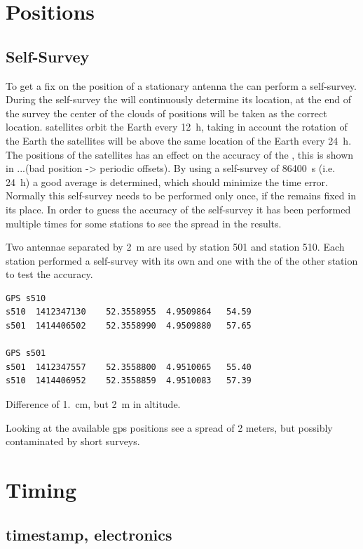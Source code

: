 \section{Positions}

\subsection{\gps Self-Survey}

To get a fix on the position of a stationary \gps antenna the \gps can perform a self-survey. During the self-survey the \gps will continuously determine its location, at the end of the survey the center of the clouds of positions will be taken as the correct location. \gps satellites orbit the Earth every \SI{12}{\hour}, taking in account the rotation of the Earth the \gps satellites will be above the same location of the Earth every \SI{24}{\hour}. The positions of the \gps satellites has an effect on the accuracy of the \gps, this is shown in ...(bad position -> periodic offsets). By using a self-survey of \SI{86400}{\second} (i.e. \SI{24}{\hour}) a good average is determined, which should minimize the time error. Normally this self-survey needs to be performed only once, if the \gps remains fixed in its place. In order to guess the accuracy of the self-survey it has been performed multiple times for some stations to see the spread in the results.

Two \gps antennae separated by \SI{2}{\meter} are used by station 501 and station 510. Each station performed a self-survey with its own \gps and one with the \gps of the other station to test the accuracy.

\begin{verbatim}
GPS s510
s510  1412347130	52.3558955	4.9509864	54.59
s501  1414406502	52.3558990	4.9509880	57.65

GPS s501
s501  1412347557	52.3558800	4.9510065	55.40
s510  1414406952	52.3558859	4.9510083	57.39
\end{verbatim}

Difference of \SI{1.}{\centi\meter}, but \SI{2}{\meter} in altitude.

Looking at the available gps positions see a spread of 2 meters, but possibly contaminated by short surveys.


\section{Timing}

\subsection{\gps timestamp, electronics}

